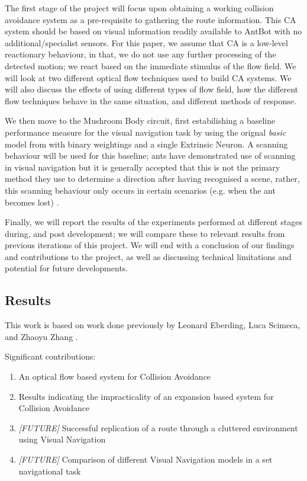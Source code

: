\documentclass[a4paper,12pt]{article}
\begin{document}
The first stage of the project will focus upon obtaining a working collision avoidance system as a
pre-requisite to gathering the route information. This CA system should be based on visual
information readily available to AntBot with no additional/specialist sensors. For this paper, we
assume that CA is a low-level reactionary behaviour, in that, we do not use any further processing
of the detected motion; we react based on the immediate stimulus of the flow
field. We will look at two different optical flow techniques used to build CA systems. We will also
discuss the effects of using different types of flow field, how the different flow
techniques behave in the same situation, and different methods of response.
\newline

We then move to the Mushroom Body circuit, first estabilishing a baseline performance measure for
the visual navigation task by using the orignal \textit{basic} model from \cite{Ardin2016} with
binary weightings and a single Extrinsic Neuron. A scanning behaviour will be used for this baseline;
ants have demonstrated use of scanning in visual navigation but it is generally accepted that this
is not the primary method they use to determine a direction after having recognised a scene, rather,
this scanning behaviour only occurs in certain scenarios (e.g. when the ant becomes lost)
\cite{Kodzhabashev2015}. 
\newline

Finally, we will report the results of the experiments performed at different stages during, and
post development; we will compare these to relevant results from previous iterations of
this project. We will end with a conclusion of our findings and contributions to the project,
as well as discussing technical limitations and potential for future developments.
\newline

\subsection { Results }
This work is based on work done previously by Leonard Eberding, Luca Scimeca, and Zhaoyu Zhang
\cite{Eberding2016, Scimeca2017, Zhang2017}.
\newline

Significant contributions:
\begin{enumerate}
  \item{An optical flow based system for Collision Avoidance}
  \item{Results indicating the impracticality of an expansion based system for Collision Avoidance}
  \item{\textit{[FUTURE]} Successful replication of a route through a cluttered environment using Visual Navigation}
  \item{\textit{[FUTURE]} Comparison of different Visual Navigation models in a set navigational task}
    
\end{enumerate}
\end{document}
